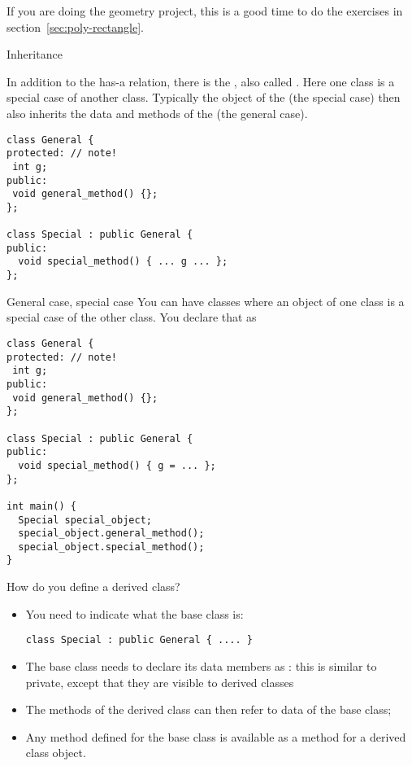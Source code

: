 \begin{exercise}
  If you are doing the geometry project, this is a good time to
  do the exercises in section~\ref{sec:poly-rectangle}.
\end{exercise}

 {Inheritance}
\label{sec:inheritance}

In addition to the has-a relation, there is the , also called . Here one class is
a special case of another class.
Typically the object of the  (the special
case) then also inherits the data and methods of the
 (the general case).
\begin{verbatim}
class General {
protected: // note!
 int g;
public:
 void general_method() {};
};

class Special : public General {
public:
  void special_method() { ... g ... };
};
\end{verbatim}

\begin{slide}{General case, special case}
  \label{sl:obj-case}
  You can have classes where an object of one class is a special case of
  the other class. You declare that as
\begin{verbatim}
class General {
protected: // note!
 int g;
public:
 void general_method() {};
};

class Special : public General {
public:
  void special_method() { g = ... };
};

int main() {
  Special special_object;
  special_object.general_method();
  special_object.special_method();
}
\end{verbatim}
\end{slide}

How do you define a derived class?
\begin{itemize}
\item You need to indicate what the base class is:
\begin{verbatim}
class Special : public General { .... }
\end{verbatim}
\item The base class needs to declare its data members as
  : this is similar to private, except that
  they are visible to derived classes
\item The methods of the derived class can then refer to data of the
  base class;
\item Any method defined for the base class is available as a method
  for a derived class object.
\end{itemize}

